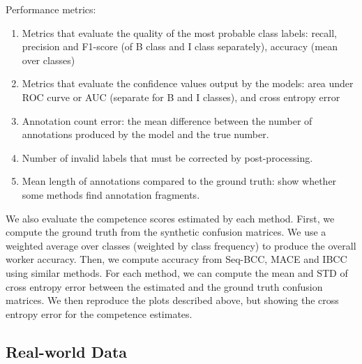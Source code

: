 Performance metrics:
\begin{enumerate}
  \item Metrics that evaluate the quality of the most probable class labels: recall, precision and F1-score (of B class and I class separately), accuracy (mean over classes)
  \item Metrics that evaluate the confidence values output by the models: area under ROC curve or AUC (separate for B and I classes), and cross entropy error %
  \item Annotation count error: the mean difference between the number of annotations produced by the model and the true number.
  \item Number of invalid labels that must be corrected by post-processing.
  \item Mean length of annotations compared to the ground truth: show whether some methods find annotation fragments.
\end{enumerate}

We also evaluate the competence scores estimated by each method. First, we compute the ground truth from the 
synthetic confusion matrices. We use a weighted average over classes (weighted by class frequency) to produce the 
overall worker accuracy. Then, we compute accuracy from Seq-BCC, MACE and IBCC using similar methods. 
For each method, we can compute the mean and STD of cross entropy error between the estimated and the ground truth
 confusion matrices. We then reproduce the plots described above, but showing the cross entropy error for the 
 competence estimates. 

\subsection{Real-world Data}


